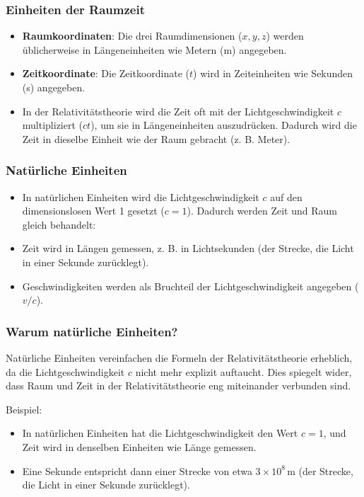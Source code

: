 \documentclass[a4paper,12pt]{article}
\begin{document}
	\subsubsection{Einheiten der Raumzeit}
	\begin{itemize}
		\item \textbf{Raumkoordinaten}: Die drei Raumdimensionen (\( x, y, z \)) werden üblicherweise in Längeneinheiten wie Metern (m) angegeben.
		\item \textbf{Zeitkoordinate}: Die Zeitkoordinate (\( t \)) wird in Zeiteinheiten wie Sekunden (s) angegeben.
		\item In der Relativitätstheorie wird die Zeit oft mit der Lichtgeschwindigkeit \( c \) multipliziert (\( ct \)), um sie in Längeneinheiten auszudrücken. Dadurch wird die Zeit in dieselbe Einheit wie der Raum gebracht (z. B. Meter).
	\end{itemize}
	
	\subsubsection{Natürliche Einheiten}
	\begin{itemize}
		\item In natürlichen Einheiten wird die Lichtgeschwindigkeit \( c \) auf den dimensionslosen Wert 1 gesetzt (\( c = 1 \)). Dadurch werden Zeit und Raum gleich behandelt:
		\item Zeit wird in Längen gemessen, z. B. in Lichtsekunden (der Strecke, die Licht in einer Sekunde zurücklegt).
		\item Geschwindigkeiten werden als Bruchteil der Lichtgeschwindigkeit angegeben (\( v/c \)).
	\end{itemize}
	
	\subsubsection{Warum natürliche Einheiten?}
	Natürliche Einheiten vereinfachen die Formeln der Relativitätstheorie erheblich, da die Lichtgeschwindigkeit \( c \) nicht mehr explizit auftaucht. Dies spiegelt wider, dass Raum und Zeit in der Relativitätstheorie eng miteinander verbunden sind.
	
	Beispiel:
	\begin{itemize}
		\item In natürlichen Einheiten hat die Lichtgeschwindigkeit den Wert \( c = 1 \), und Zeit wird in denselben Einheiten wie Länge gemessen.
		\item Eine Sekunde entspricht dann einer Strecke von etwa \( 3 \times 10^8 \, \text{m} \) (der Strecke, die Licht in einer Sekunde zurücklegt).
	\end{itemize}
	
\end{document}
